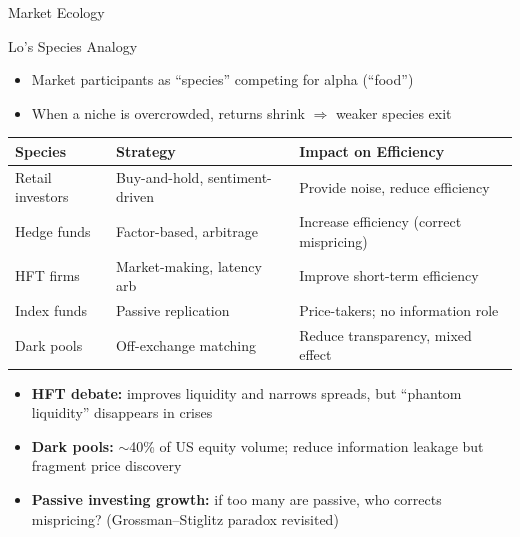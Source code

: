 \documentclass[9pt, aspectratio=169, t]{beamer}
\theoremstyle{definition}
\newenvironment{cminipage}[1]{%
    \par\noindent\hfill\begin{minipage}{#1}\ignorespaces
}{%
    \end{minipage}\hfill\null\par
}
\begin{document}
\begin{frame}{Market Ecology}
\begin{cminipage}{0.95\textwidth}
\small
\begin{block}{Lo's Species Analogy}
\begin{itemize}\setlength{\itemsep}{0pt}
    \item Market participants as ``species'' competing for alpha (``food'')
    \item When a niche is overcrowded, returns shrink $\Rightarrow$ weaker species exit
\end{itemize}
\end{block}

\footnotesize
\renewcommand{\arraystretch}{1.1}
\begin{center}
\begin{tabular}{lll}
\toprule
\textbf{Species} & \textbf{Strategy} & \textbf{Impact on Efficiency} \\
\midrule
Retail investors & Buy-and-hold, sentiment-driven & Provide noise, reduce efficiency \\
Hedge funds & Factor-based, arbitrage & Increase efficiency (correct mispricing) \\
HFT firms & Market-making, latency arb & Improve short-term efficiency \\
Index funds & Passive replication & Price-takers; no information role \\
Dark pools & Off-exchange matching & Reduce transparency, mixed effect \\
\bottomrule
\end{tabular}
\end{center}

\vspace{0.1cm}
\begin{itemize}\setlength{\itemsep}{0pt}
    \item \textbf{HFT debate:} improves liquidity and narrows spreads, but ``phantom liquidity'' disappears in crises
    \item \textbf{Dark pools:} $\sim$40\% of US equity volume; reduce information leakage but fragment price discovery
    \item \textbf{Passive investing growth:} if too many are passive, who corrects mispricing? (Grossman--Stiglitz paradox revisited)
\end{itemize}
\end{cminipage}
\end{frame}
\end{document}
